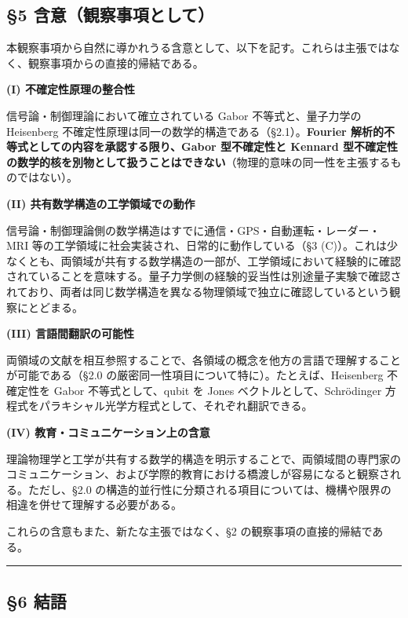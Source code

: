 \documentclass[
]{ltjsarticle}
\begin{document}
\subsection{§5
含意（観察事項として）}\label{ux542bux610fux89b3ux5bdfux4e8bux9805ux3068ux3057ux3066}

本観察事項から自然に導かれうる含意として、以下を記す。これらは主張ではなく、観察事項からの直接的帰結である。

\textbf{(I) 不確定性原理の整合性}

信号論・制御理論において確立されている Gabor 不等式と、量子力学の
Heisenberg 不確定性原理は同一の数学的構造である（§2.1）。\textbf{Fourier
解析的不等式としての内容を承認する限り、Gabor 型不確定性と Kennard
型不確定性の数学的核を別物として扱うことはできない}（物理的意味の同一性を主張するものではない）。

\textbf{(II) 共有数学構造の工学領域での動作}

信号論・制御理論側の数学構造はすでに通信・GPS・自動運転・レーダー・MRI
等の工学領域に社会実装され、日常的に動作している（§3
(C)）。これは少なくとも、両領域が共有する数学構造の一部が、工学領域において経験的に確認されていることを意味する。量子力学側の経験的妥当性は別途量子実験で確認されており、両者は同じ数学構造を異なる物理領域で独立に確認しているという観察にとどまる。

\textbf{(III) 言語間翻訳の可能性}

両領域の文献を相互参照することで、各領域の概念を他方の言語で理解することが可能である（§2.0
の厳密同一性項目について特に）。たとえば、Heisenberg 不確定性を Gabor
不等式として、qubit を Jones ベクトルとして、Schrödinger
方程式をパラキシャル光学方程式として、それぞれ翻訳できる。

\textbf{(IV) 教育・コミュニケーション上の含意}

理論物理学と工学が共有する数学的構造を明示することで、両領域間の専門家のコミュニケーション、および学際的教育における橋渡しが容易になると観察される。ただし、§2.0
の構造的並行性に分類される項目については、機構や限界の相違を併せて理解する必要がある。

これらの含意もまた、新たな主張ではなく、§2
の観察事項の直接的帰結である。

\begin{center}\rule{0.5\linewidth}{0.5pt}\end{center}

\subsection{§6 結語}\label{ux7d50ux8a9e}
\end{document}

